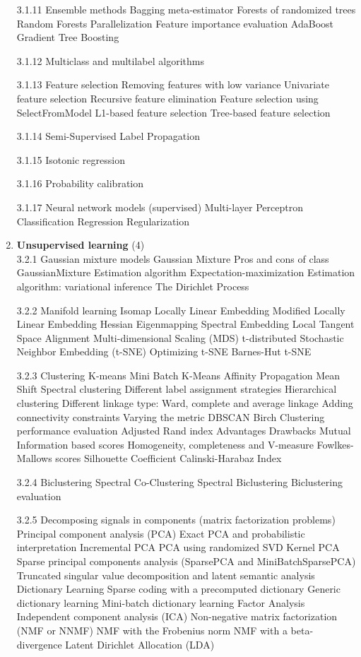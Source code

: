 \documentclass{article}
\begin{document}
\begin{enumerate}
3.1.11 Ensemble methods
Bagging meta-estimator
Forests of randomized trees
Random Forests
Parallelization
Feature importance evaluation
AdaBoost
Gradient Tree Boosting

3.1.12 Multiclass and multilabel algorithms

3.1.13 Feature selection
Removing features with low variance
Univariate feature selection
Recursive feature elimination
Feature selection using SelectFromModel
L1-based feature selection
Tree-based feature selection

3.1.14 Semi-Supervised
Label Propagation

3.1.15 Isotonic regression

3.1.16 Probability calibration

3.1.17 Neural network models (supervised)
Multi-layer Perceptron
Classification
Regression
Regularization

\item \textbf{Unsupervised learning} (4)\\

3.2.1 Gaussian mixture models
Gaussian Mixture
Pros and cons of class GaussianMixture
Estimation algorithm Expectation-maximization
Estimation algorithm: variational inference
The Dirichlet Process

3.2.2 Manifold learning
Isomap
Locally Linear Embedding
Modified Locally Linear Embedding
Hessian Eigenmapping
Spectral Embedding
Local Tangent Space Alignment
Multi-dimensional Scaling (MDS)
t-distributed Stochastic Neighbor Embedding (t-SNE)
Optimizing t-SNE
Barnes-Hut t-SNE


3.2.3 Clustering
K-means
Mini Batch K-Means
Affinity Propagation
Mean Shift
Spectral clustering
Different label assignment strategies
Hierarchical clustering
Different linkage type: Ward, complete and average linkage
Adding connectivity constraints
Varying the metric
DBSCAN
Birch
Clustering performance evaluation
Adjusted Rand index
Advantages
Drawbacks
Mutual Information based scores
Homogeneity, completeness and V-measure
Fowlkes-Mallows scores
Silhouette Coefficient
Calinski-Harabaz Index

3.2.4 Biclustering
Spectral Co-Clustering
Spectral Biclustering
Biclustering evaluation

3.2.5 Decomposing signals in components (matrix factorization problems)
Principal component analysis (PCA)
Exact PCA and probabilistic interpretation
Incremental PCA
PCA using randomized SVD
Kernel PCA
Sparse principal components analysis (SparsePCA and MiniBatchSparsePCA)
Truncated singular value decomposition and latent semantic analysis
Dictionary Learning
Sparse coding with a precomputed dictionary
Generic dictionary learning
Mini-batch dictionary learning
Factor Analysis
Independent component analysis (ICA)
Non-negative matrix factorization (NMF or NNMF)
NMF with the Frobenius norm
NMF with a beta-divergence
Latent Dirichlet Allocation (LDA)


\end{enumerate}
\end{document}
